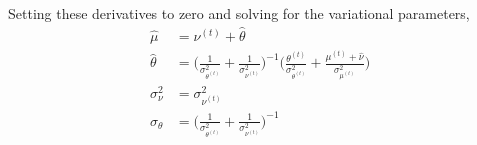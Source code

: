 \documentclass[10pt]{article}
\theoremstyle{plain}
\theoremstyle{definition}
\newcommand{\<}{\langle}
\renewcommand{\>}{\rangle}
\begin{document}
Setting these derivatives to zero and solving for the variational parameters, 
\begin{align}
\hat \mu &= \nu^{(t)} + \hat\theta\\
\hat \theta &= \Big(\frac{1}{\sigma^2_{\theta^{(t)}}}  + \frac{1}{\sigma^2_{\nu^{(t)}} }\Big)^{-1}\Big(\frac{\theta^{(t)}}{\sigma^2_{\theta^{(t)}}} + \frac{\mu^{(t)}  + \hat\nu}{\sigma^2_{\mu^{(t)}}}\Big)\\
\sigma_\nu^2 &= \sigma^2_{\nu^{(t)}}\\
\sigma_\theta &= \Big(\frac{1}{\sigma^2_{\theta^{(t)}}}  + \frac{1}{\sigma^2_{\nu^{(t)}} }\Big)^{-1}
\end{align}
\end{document}
